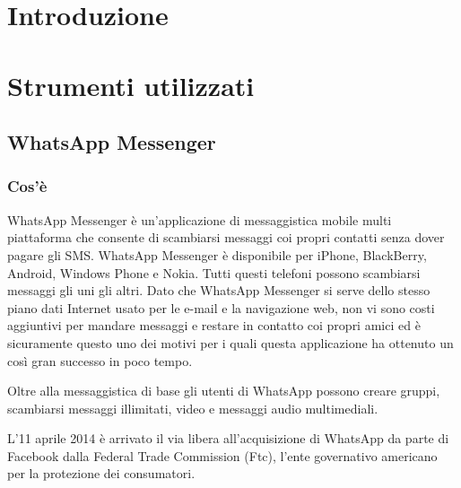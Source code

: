 \documentclass[a4paper,11pt]{book}
\begin{document}
\begin{frontespizio}
\end{frontespizio}


\tableofcontents

\chapter{Introduzione}


\chapter{Strumenti utilizzati}

\section{WhatsApp Messenger}
\subsection{Cos'\`e}
WhatsApp Messenger \`e un'applicazione di messaggistica mobile multi piattaforma che consente di scambiarsi messaggi coi propri contatti senza dover pagare gli SMS. WhatsApp Messenger \`e disponibile per iPhone, BlackBerry, Android, Windows Phone e Nokia. Tutti questi telefoni possono scambiarsi messaggi gli uni gli altri. Dato che WhatsApp Messenger si serve dello stesso piano dati Internet usato per le e-mail e la navigazione web, non vi sono costi aggiuntivi per mandare messaggi e restare in contatto coi propri amici ed \`e sicuramente questo uno dei motivi per i quali questa applicazione ha ottenuto un cos\`i gran successo in poco tempo.

Oltre alla messaggistica di base gli utenti di WhatsApp possono creare gruppi, scambiarsi messaggi illimitati, video e messaggi audio multimediali.

L'11 aprile 2014 \`e arrivato il via libera all'acquisizione di WhatsApp da parte di Facebook dalla Federal Trade Commission (Ftc), l'ente governativo americano per la protezione dei consumatori.
\end{document}
